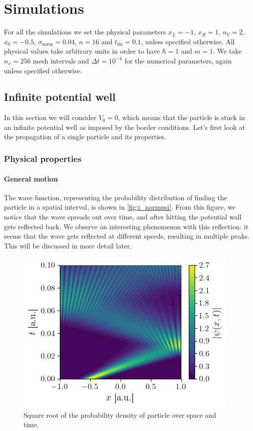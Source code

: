 \section{Simulations}

For all the simulations we set the physical parameters \(x_L = -1\), \(x_R = 1\), $n_V = 2$, \(x_0 = -0.5\), \mbox{\(\sigma_\textrm{norm} = 0.04\)}, \(n = 16\) and \(t_\textrm{fin} = 0.1\), unless specified otherwise. All physical values take arbitrary units in order to have \(\hbar = 1\) and $m=1$. We take \(n_x = 256\) mesh intervals and \(\Delta t = 10^{-4}\) for the numerical parameters, again unless specified otherwise.

\subsection{Infinite potential well}

In this section we will consider \(V_0 = 0\), which means that the particle is stuck in an infinite potential well as imposed by the border conditions. Let's first look at the propagation of a single particle and its properties.

\subsubsection{Physical properties}

\paragraph{General motion} The wave function, representing the probability distribution of finding the particle in a spatial interval, is shown in \autoref{fig:i_normpsi}. From this figure, we notice that the wave spreads out over time, and after hitting the potential wall gets reflected back. We observe an interesting phenomenon with this reflection: it seems that the wave gets reflected at different speeds, resulting in multiple peaks. This will be discussed in more detail later.

\begin{figure}[h]
    \centering
    \includegraphics[width=0.6\linewidth]{figures/i_normpsi.png}
    \caption{Square root of the probability density of particle over space and time.}
    \label{fig:i_normpsi}
\end{figure}

